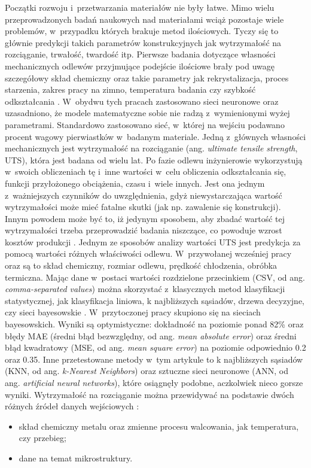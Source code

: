 Początki rozwoju i~przetwarzania materiałów nie były łatwe. Mimo wielu przeprowadzonych badań naukowych nad materiałami wciąż pozostaje wiele problemów, w~przypadku których brakuje metod ilościowych. Tyczy się to głównie predykcji takich parametrów konstrukcyjnych jak wytrzymałość na rozciąganie, trwałość, twardość itp. Pierwsze badania dotyczące własności mechanicznych odlewów przyjmujące podejście ilościowe brały pod uwagę szczegółowy skład chemiczny oraz takie parametry jak rekrystalizacja, proces starzenia, zakres pracy na zimno, temperatura badania czy szybkość odkształcania \cite{Bhadeshia07, Badmos13}. W~obydwu tych pracach zastosowano sieci neuronowe oraz uzasadniono, że modele matematyczne sobie nie radzą z~wymienionymi wyżej parametrami. Standardowo zastosowano sieć, w~której na wejściu podawano procent wagowy pierwiastków w~badanym materiale. 
Jedną z~głównych własności mechanicznych jest wytrzymałość na rozciąganie (ang. \textit{ultimate tensile strength}, UTS), która jest badana od wielu lat. Po fazie odlewu inżynierowie wykorzystują w~swoich obliczeniach tę i~inne wartości w~celu obliczenia odkształcania się, funkcji przyłożonego obciążenia, czasu i~wiele innych. Jest ona jednym z~ważniejszych czynników do uwzględnienia, gdyż niewystarczająca wartość wytrzymałości może mieć fatalne skutki (jak np. zawalenie się konstrukcji). Innym powodem może być to, iż jedynym sposobem, aby zbadać wartość tej wytrzymałości trzeba przeprowadzić badania niszczące, co powoduje wzrost kosztów produkcji \cite{Santos09}. Jednym ze sposobów analizy wartości UTS jest predykcja za pomocą wartości różnych właściwości odlewu. W~przywołanej wcześniej pracy \cite{Santos09} oraz \cite{Nieves09} są to skład chemiczny, rozmiar odlewu, prędkość chłodzenia, obróbka termiczna. Mając dane w~postaci wartości rozdzielone przecinkiem (CSV, od ang. \textit{comma-separated values}) można skorzystać z~klasycznych metod klasyfikacji statystycznej, jak klasyfikacja liniowa, k najbliższych sąsiadów, drzewa decyzyjne, czy sieci bayesowskie \cite{wiki:klas.stat}. W~przytoczonej pracy skupiono się na sieciach bayesowskich. Wyniki są optymistyczne: dokładność na poziomie ponad 82\% oraz błędy MAE (średni błąd bezwzględny, od ang. \textit{mean absolute error}) oraz średni błąd kwadratowy (MSE, od ang. \textit{mean square error}) na poziomie odpowiednio 0.2 oraz 0.35. Inne przetestowane metody w~tym artykule to k najbliższych sąsiadów (KNN, od ang. \textit{k-Nearest Neighbors}) oraz sztuczne sieci neuronowe (ANN, od ang. \textit{artificial neural networks}), które osiągnęły podobne, aczkolwiek nieco gorsze wyniki. 
Wytrzymałość na rozciąganie można przewidywać na podstawie dwóch różnych źródeł danych wejściowych \cite{Yang16}:
\begin{itemize}
\item
skład chemiczny metalu oraz zmienne procesu walcowania, jak temperatura, czy przebieg;
\item
dane na temat mikrostruktury. 
\end{itemize} 

